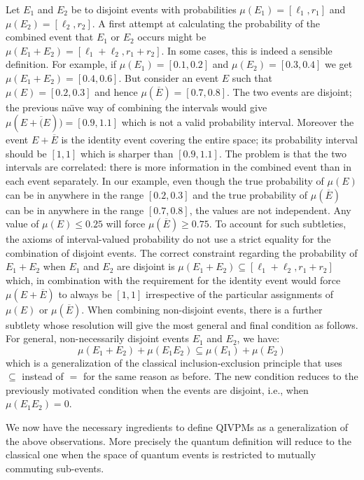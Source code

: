 \documentclass[english,reprint, aps, prl,superscriptaddress, showpacs,
showkeys, longbibliography, amsmath, amssymb]{revtex4-1}
\theoremstyle{plain}
\theoremstyle{definition}
\begin{document}
Let $E_1$ and $E_2$ be to disjoint events with probabilities
$\mu(E_1)=[\ell_1,r_1]$ and $\mu(E_2)=[\ell_2,r_2]$. A first attempt
at calculating the probability of the combined event that $E_1$ or
$E_2$ occurs might be $\mu(E_1+E_2) = [\ell_1+\ell_2,r_1+r_2]$. In
some cases, this is indeed a sensible definition. For example, if
$\mu(E_1)=[0.1,0.2]$ and $\mu(E_2)=[0.3,0.4]$ we get
$\mu(E_1+E_2) = [0.4,0.6]$. But consider an event $E$ such that
$\mu(E)=[0.2,0.3]$ and hence $\mu(\overline{E})=[0.7,0.8]$. The two
events are disjoint; the previous na\"\i ve way of combining the
intervals would give $\mu(E+\overline(E))=[0.9,1.1]$ which is not a
valid probability interval. Moreover the event $E+\overline{E}$ is the
identity event covering the entire space; its probability interval
should be $[1,1]$ which is sharper than $[0.9,1.1]$. The problem is
that the two intervals are correlated: there is more information in
the combined event than in each event separately. In our example, even
though the true probability of $\mu(E)$ can be in anywhere in the
range $[0.2,0.3]$ and the true probability of $\mu(\overline{E})$ can
be in anywhere in the range $[0.7,0.8]$, the values are not
independent. Any value of $\mu(E) \leq 0.25$ will force
$\mu(\overline{E})\geq 0.75$. To account for such subtleties, the
axioms of interval-valued probability do not use a strict equality for
the combination of disjoint events. The correct constraint regarding
the probability of $E_1+E_2$ when $E_1$ and $E_2$ are disjoint is
$\mu(E_1+E_2) \subseteq [\ell_1+\ell_2,r_1+r_2]$ which, in combination
with the requirement for the identity event would force
$\mu(E+\overline{E})$ to always be $[1,1]$ irrespective of the
particular assignments of $\mu(E)$ or $\mu(\overline{E})$. When
combining non-disjoint events, there is a further subtlety whose
resolution will give the most general and final condition as
follows. For general, non-necessarily disjoint events $E_1$ and $E_2$,
we have:
\begin{equation}
\mu(E_1+E_2) + \mu(E_1E_2) \subseteq \mu(E_1) + \mu(E_2)
\label{eq:classicalconvex}
\end{equation}
which is a generalization of the classical inclusion-exclusion
principle that uses $\subseteq$ instead of $=$ for the same reason as
before. The new condition reduces to the previously motivated
condition when the events are disjoint, i.e., when $\mu(E_1E_2) = 0$. 

We now have the necessary ingredients to define QIVPMs as a
generalization of the above observations. More precisely the quantum
definition will reduce to the classical one when the space of quantum
events is restricted to mutually commuting sub-events. 
\end{document}
